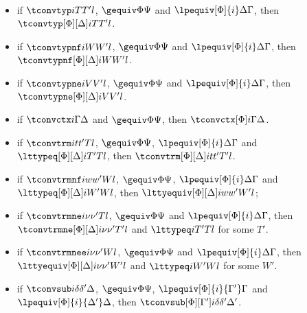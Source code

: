 \begin{lemma}[Conversion] $ $
  \begin{itemize}
  \item if $\tconvtyp i T{T'} l$, $\gequiv\Phi\Psi$ and
    $\lpequiv[\Phi]{i}\Delta\Gamma$, then $\tconvtyp[\Phi][\Delta] i T{T'} l$.
  \item if $\tconvtypnf i W{W'} l$, $\gequiv\Phi\Psi$ and
    $\lpequiv[\Phi]{i}\Delta\Gamma$, then $\tconvtypnf[\Phi][\Delta] i W{W'} l$.
  \item if $\tconvtypne i V{V'}l$, $\gequiv\Phi\Psi$ and
    $\lpequiv[\Phi]{i}\Delta\Gamma$, then $\tconvtypne[\Phi][\Delta] i V{V'}l$.
  \item if $\tconvctx i \Gamma \Delta$ and $\gequiv\Phi\Psi$, then $\tconvctx[\Phi] i \Gamma \Delta$.
  \item if $\tconvtrm i t{t'}T l$, $\gequiv\Phi\Psi$, $\lpequiv[\Phi]{i}\Delta\Gamma$
    and $\lttypeq[\Phi][\Delta] i{T'} T l$, then
    $\tconvtrm[\Phi][\Delta] i t{t'}{T'} l$.
  \item if $\tconvtrmnf i w{w'}W l$, $\gequiv\Phi\Psi$, $\lpequiv[\Phi]{i}\Delta\Gamma$
    and $\lttypeq[\Phi][\Delta] i{W'}W l$, then $\lttyequiv[\Phi][\Delta] i w{w'}{W'} l$;
  \item if $\tconvtrmne i \nu{\nu'}T l$, $\gequiv\Phi\Psi$ and
    $\lpequiv[\Phi]{i}\Delta\Gamma$, then $\tconvtrmne[\Phi][\Delta] i \nu{\nu'}{T'} l$
    and $\lttypeq i{T'}{T}l$ for some $T'$. 
  \item if $\tconvtrmnee i \nu{\nu'}W l$, $\gequiv\Phi\Psi$ and
    $\lpequiv[\Phi]{i}\Delta\Gamma$, then $\lttyequiv[\Phi][\Delta] i \nu{\nu'}{W'} l$
    and $\lttypeq i{W'}{W}l$ for some $W'$.
  \item if $\tconvsub i{\delta}{\delta'}\Delta$, $\gequiv\Phi\Psi$,
    $\lpequiv[\Phi]{i}{\Gamma'}\Gamma$ and $\lpequiv[\Phi]{i}{\Delta'}\Delta$, then
    $\tconvsub[\Phi][\Gamma'] i{\delta}{\delta'}{\Delta'}$.
  \end{itemize}
\end{lemma}
